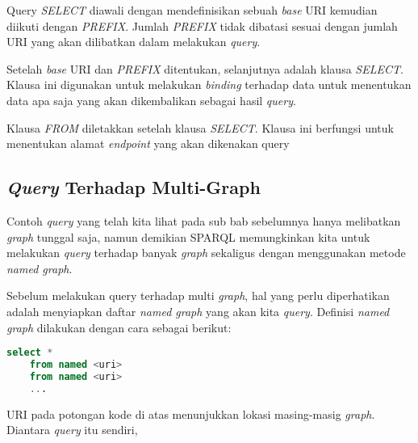 Query \emph{SELECT} diawali dengan mendefinisikan sebuah \emph{base} URI kemudian diikuti dengan \emph{PREFIX}. Jumlah \emph{PREFIX} tidak dibatasi sesuai dengan jumlah URI yang akan dilibatkan dalam melakukan \emph{query}.

Setelah \emph{base} URI dan \emph{PREFIX} ditentukan, selanjutnya adalah klausa \emph{SELECT}. Klausa ini digunakan untuk melakukan \emph{binding} terhadap data untuk menentukan data apa saja yang akan dikembalikan sebagai hasil \emph{query}.

Klausa \emph{FROM} diletakkan setelah klausa \emph{SELECT}. Klausa ini berfungsi untuk menentukan alamat \emph{endpoint} yang akan dikenakan query

\subsection{\emph{Query} Terhadap Multi-Graph}
Contoh \emph{query} yang telah kita lihat pada sub bab sebelumnya hanya melibatkan \emph{graph} tunggal saja, namun demikian SPARQL memungkinkan kita untuk melakukan \emph{query} terhadap banyak \emph{graph} sekaligus dengan menggunakan metode \emph{named graph}.

Sebelum melakukan query terhadap multi \emph{graph}, hal yang perlu diperhatikan adalah menyiapkan daftar \emph{named graph} yang akan kita \emph{query}. Definisi \emph{named graph} dilakukan dengan cara sebagai berikut:

\begin{lstlisting}[language=SQL]
	select *
	from named <uri>
	from named <uri>
	...
\end{lstlisting}

URI pada potongan kode di atas menunjukkan lokasi masing-masig \emph{graph}. Diantara \emph{query} itu sendiri, 